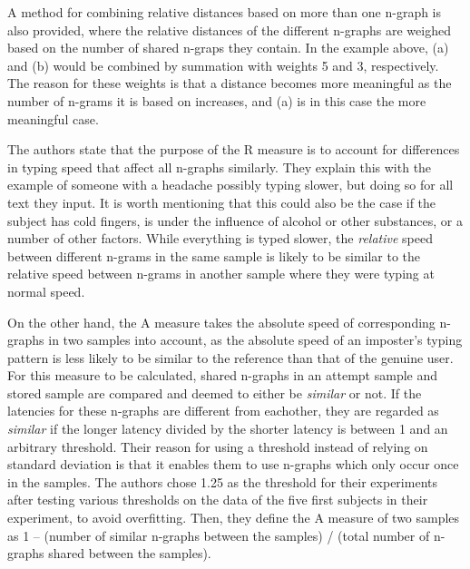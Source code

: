 \documentclass[informationsecurity]{gucmasterproject}
\begin{document}
A method for combining relative distances based on more than one n-graph is also provided, where the relative distances of the different n-graphs are weighed based on the number of shared n-graps they contain. 
In the example above, (a) and (b) would be combined by summation with weights 5 and 3, respectively.
The reason for these weights is that a distance becomes more meaningful as the number of n-grams it is based on increases, and (a) is in this case the more meaningful case.

The authors state that the purpose of the R measure is to account for differences in typing speed that affect all n-graphs similarly.
They explain this with the example of someone with a headache possibly typing slower, but doing so for all text they input.
It is worth mentioning that this could also be the case if the subject has cold fingers, is under the influence of alcohol or other substances, or a number of other factors.
While everything is typed slower, the \textit{relative} speed between different n-grams in the same sample is likely to be similar to the relative speed between n-grams in another sample where they were typing at normal speed.

On the other hand, the A measure takes the absolute speed of corresponding n-graphs in two samples into account, as the absolute speed of an imposter's typing pattern is less likely to be similar to the reference than that of the genuine user.
For this measure to be calculated, shared n-graphs in an attempt sample and stored sample are compared and deemed to either be \textit{similar} or not.
If the latencies for these n-graphs are different from eachother, they are regarded as \textit{similar} if the longer latency divided by the shorter latency is between 1 and an arbitrary threshold.
Their reason for using a threshold instead of relying on standard deviation is that it enables them to use n-graphs which only occur once in the samples.
The authors chose 1.25 as the threshold for their experiments after testing various thresholds on the data of the five first subjects in their experiment, to avoid overfitting.
Then, they define the A measure of two samples as 1 -- (number of similar n-graphs between the samples) / (total number of n-graphs shared between the samples).
\end{document}
